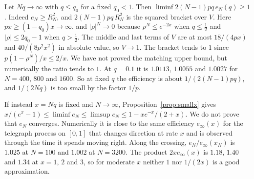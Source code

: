 \begin{remark}\label{rem:fisher-regimes}
Let $Nq\to\infty$ with $q\le q_0$ for a fixed $q_0<1$. Then
$\liminf2(N-1)pq\,e_N(q)\ge1$. Indeed $e_N\ge R^2_N$, and
$2(N-1)pq\,R^2_N$ is the squared bracket over $V$. Here
$px\ge(1-q_0)x\to\infty$, and $\lvert\rho\rvert^N\to0$ because
$\rho^N\le e^{-2x}$ when $q\le\frac12$ and $\lvert\rho\rvert\le2q_0-1$ when
$q>\frac12$. The middle and last terms of $V$ are at most $18/(4px)$ and
$40/(8p^2x^2)$ in absolute value, so $V\to1$. The bracket tends to $1$
since $p(1-\rho^N)/x\le2/x$.
We have not proved the matching upper bound, but numerically the ratio
tends to $1$. At $q=0.1$ it is $1.0113$, $1.0055$ and $1.0027$ for $N=400$,
$800$ and $1600$. So at fixed $q$ the efficiency is about $1/(2(N-1)pq)$,
and $1/(2Nq)$ is too small by the factor $1/p$.

If instead $x=Nq$ is fixed and $N\to\infty$, Proposition~\ref{prop:smallx}
gives $x/(e^x-1)\le\liminf e_N\le\limsup e_N\le1-xe^{-x}/(2+x)$. We do not
prove that $e_N$ converges. Numerically it is close to the same efficiency
$e_\infty(x)$ for the telegraph process on $[0,1]$ that changes direction at
rate $x$ and is observed through the time it spends moving right. Along the
crossing, $e_N/e_\infty(x_N)$ is $1.025$ at $N=100$ and $1.002$ at
$N=3200$. The product $2xe_\infty(x)$ is $1.18$, $1.40$ and $1.34$ at $x=1$,
$2$ and $3$, so for moderate $x$ neither $1$ nor $1/(2x)$ is a good
approximation.
\end{remark}
